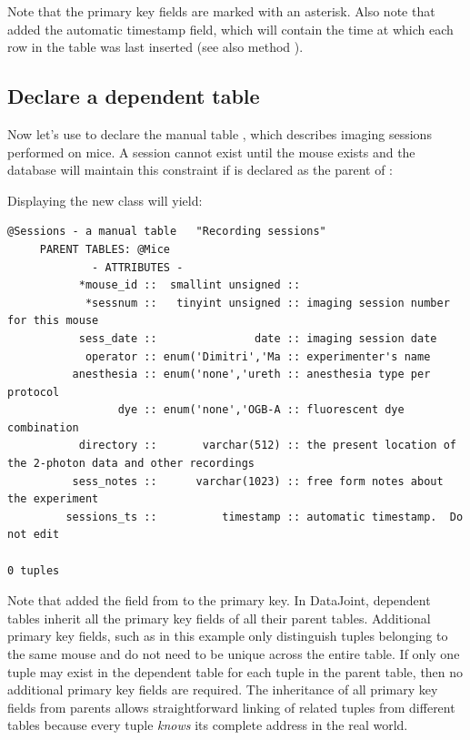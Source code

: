 \documentclass[10pt]{article}
\begin{document}
Note that the primary key fields are marked with an asterisk. Also note that  added the automatic  timestamp field, which will contain the time at which each row in the table was last inserted (see also method ).

\subsection{Declare a dependent table}
Now let's use  to declare the manual table , which describes imaging sessions performed on mice.  A session cannot exist until the mouse exists and the database will maintain this constraint if  is declared as the parent of :

Displaying the new class  will yield:
\begin{scriptsize}
\begin{verbatim}
@Sessions - a manual table   "Recording sessions"
     PARENT TABLES: @Mice
             - ATTRIBUTES -
           *mouse_id ::  smallint unsigned :: 
            *sessnum ::   tinyint unsigned :: imaging session number for this mouse
           sess_date ::               date :: imaging session date
            operator :: enum('Dimitri','Ma :: experimenter's name
          anesthesia :: enum('none','ureth :: anesthesia type per protocol
                 dye :: enum('none','OGB-A :: fluorescent dye combination
           directory ::       varchar(512) :: the present location of the 2-photon data and other recordings
          sess_notes ::      varchar(1023) :: free form notes about the experiment
         sessions_ts ::          timestamp :: automatic timestamp.  Do not edit

0 tuples
\end{verbatim}
\end{scriptsize}


Note that  added the  field from  to the primary key.  In DataJoint, dependent tables inherit all the primary key fields of all their parent tables.   Additional primary key fields, such as  in this example only distinguish tuples belonging to the same mouse and do not need to be unique across the entire table.  If only one tuple may exist in the dependent table for each tuple in the parent table, then no additional primary key fields are required.  The inheritance of all primary key fields from parents allows straightforward linking of related tuples from different tables because every tuple {\em knows} its complete address in the real world.
\end{document}
